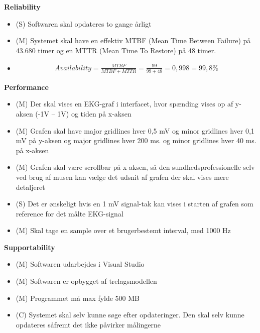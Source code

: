 \textbf{Reliability}
\begin{itemize}
	\item (S) Softwaren skal opdateres to gange årligt
	\item (M) Systemet skal have en effektiv MTBF (Mean Time Between Failure) på 43.680 timer og en MTTR (Mean Time To Restore) på 48 timer.
	\item  
				\begin{align}
					Availability = \frac{MTBF}{MTBF+MTTR} = \frac{99}{99+48} = 0,998 = 99,8 \%
				\end{align}

\end{itemize}

\textbf{Performance}
\begin{itemize}
	\item (M) Der skal vises en EKG-graf i interfacet, hvor spænding vises op af y-aksen (-1V – 1V) og tiden på x-aksen
	\item (M) Grafen skal have major gridlines hver 0,5 mV og minor gridlines hver 0,1 mV på y-aksen og major gridlines hver 200 ms. og minor gridlines hver 40 ms. på x-aksen
	\item (M) Grafen skal være scrollbar på x-aksen, så den sundhedsprofessionelle selv ved brug af musen kan vælge det udsnit af grafen der skal vises mere detaljeret
	\item (S) Det er ønskeligt hvis en 1 mV signal-tak kan vises i starten af grafen som reference for det målte EKG-signal
	\item (M) Skal tage en sample over et brugerbestemt interval, med 1000 Hz
\end{itemize}

\textbf{Supportability}
\begin{itemize}
	\item (M) Softwaren udarbejdes i Visual Studio
	\item (M) Softwaren er opbygget af trelagsmodellen
	\item (M) Programmet må max fylde 500 MB
	\item (C) Systemet skal selv kunne søge efter opdateringer. Den skal selv kunne opdateres såfremt det ikke påvirker målingerne
\end{itemize}














